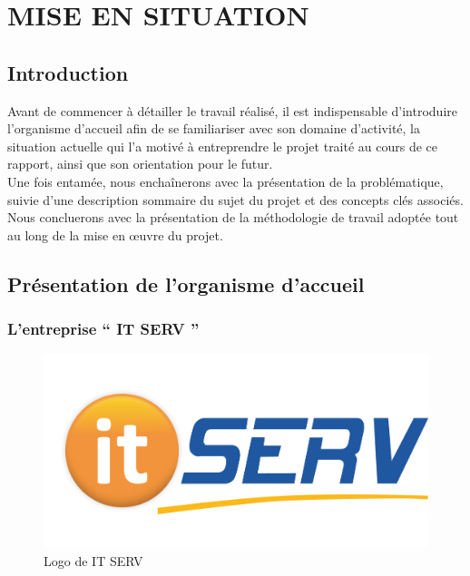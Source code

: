 
\setcounter{mtc}{3} %
\chapter{MISE EN SITUATION}
\minitoc  %

\graphicspath{{Chapitre1/figures/}}
\pagestyle{fancy}
\fancyhf{}
\fancyhead[R]{\bfseries\rightmark}
\fancyfoot[R]{\thepage}
\renewcommand{\headrulewidth}{0.5pt}
\renewcommand{\footrulewidth}{0pt}
\renewcommand{\chaptermark}[1]{\markboth{\MakeUppercase{\chaptername~\thechapter. #1 }}{}}
\renewcommand{\sectionmark}[1]{\markright{\thechapter.\thesection~ #1}}

\begin{spacing}{1.5}

\section*{Introduction}
Avant de commencer à détailler le travail réalisé, il est indispensable d'introduire l'organisme d'accueil afin de se familiariser avec son domaine d'activité, la situation actuelle qui l'a motivé à entreprendre le projet traité au cours de ce rapport, ainsi que son orientation pour le futur.\\
Une fois entamée, nous enchaînerons avec la présentation de la problématique, suivie d'une description sommaire du sujet du projet et des concepts clés associés. Nous concluerons avec la présentation de la méthodologie de travail adoptée tout au long de la mise en œuvre du projet.


\section{Présentation de l'organisme d'accueil}

\subsection{L'entreprise “ IT SERV ”}

\begin{figure}[h]
\centering
\includegraphics[width=0.3\linewidth]{logoITSERV.png}
\caption{Logo de IT SERV}
\label{fig:logoITSERV}
\end{figure}


\end{spacing}
